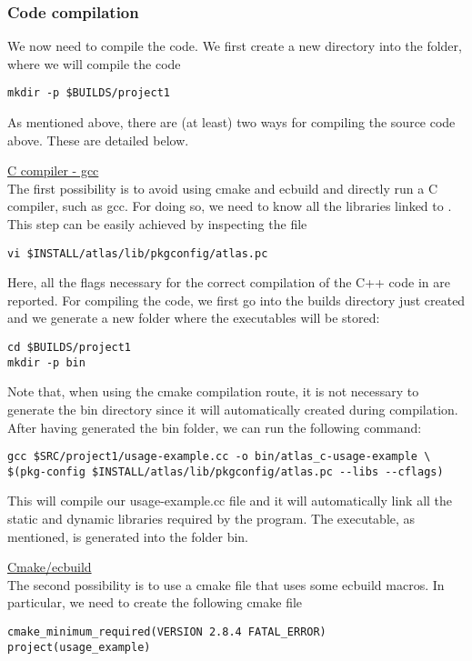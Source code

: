 \subsubsection*{Code compilation}
We now need to compile the code. We first create a new directory
into the  folder, where we will compile the code
%
\begin{lstlisting}[style=BashStyle]
mkdir -p $BUILDS/project1
\end{lstlisting}
%
As mentioned above, there are (at least) two ways for compiling 
the source code above. These are detailed below.
%
\begin{description}
%
\item \underline{C compiler - gcc}\\
%
The first possibility is to 
avoid using cmake and ecbuild and directly run a C compiler, 
such as gcc. For doing so, we need to know all the libraries 
linked to \Atlas. This step can be easily achieved by inspecting 
the file 
%
\begin{lstlisting}[style=BashStyle]
vi $INSTALL/atlas/lib/pkgconfig/atlas.pc
\end{lstlisting}
%
Here, all the flags necessary for the correct compilation 
of the C++ code in  are reported. For 
compiling the code, we first go into the builds directory 
just created and we generate a new folder where the executables 
will be stored: 
%
\begin{lstlisting}[style=BashStyle]
cd $BUILDS/project1
mkdir -p bin
\end{lstlisting}
%
Note that, when using the cmake compilation route, it is not 
necessary to generate the bin directory since it will automatically 
created during compilation.
After having generated the bin folder, we can run the following 
command:
%
\begin{lstlisting}[style=BashStyle]
gcc $SRC/project1/usage-example.cc -o bin/atlas_c-usage-example \ 
$(pkg-config $INSTALL/atlas/lib/pkgconfig/atlas.pc --libs --cflags)
\end{lstlisting}
%
This will compile our usage-example.cc file and it will automatically 
link all the static and dynamic libraries required by the program. 
The executable, as mentioned, is generated into the folder bin.
%
\item \underline{Cmake/ecbuild}\\
%
The second possibility is to use a cmake file that uses some 
ecbuild macros. In particular, we need to create the following 
cmake file
%
\begin{lstlisting}[style=XMLStyle]
cmake_minimum_required(VERSION 2.8.4 FATAL_ERROR)
project(usage_example)


\end{lstlisting}
\end{description}
